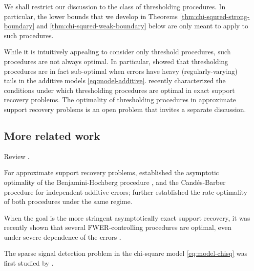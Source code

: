 We shall restrict our discussion to the class of thresholding procedures.
In particular, the lower bounds that we develop in Theorems \ref{thm:chi-squred-strong-boundary} and \ref{thm:chi-squred-weak-boundary} below are only meant to apply to such procedures.

\begin{remark}
While it is intuitively appealing to consider only threshold procedures, such procedures are not always optimal.
In particular, \citet{chen2018scan} showed that thresholding procedures are in fact sub-optimal when errors have heavy (regularly-varying) tails in the additive models \eqref{eq:model-additive}. 
\citet{gao2018fundamental} recently characterized the conditions under which thresholding procedures are optimal in exact support recovery problems.
The optimality of thresholding procedures in approximate support recovery problems is an open problem that invites a separate discussion.
\end{remark}


\subsection{More related work}

Review \cite{jin2014optimality, jin2016rare, butucea2018variable, arias2017distribution, gao2018fundamental, ji2012ups, rabinovich2017optimal}.


For approximate support recovery problems, \citet*{arias2017distribution} established the asymptotic optimality of the Benjamini-Hochberg procedure \cite{benjamini1995controlling}, and the Cand\'es-Barber procedure \cite{barber2015controlling} for independent additive errors;
\citet{rabinovich2017optimal} further established the rate-optimality of both procedures under the same regime.

When the goal is the more stringent asymptotically exact support recovery, it was recently shown that several FWER-controlling procedures are optimal, even under severe dependence of the errors \cite{gao2018fundamental}.

The sparse signal detection problem in the chi-square model \eqref{eq:model-chisq} was first studied by \cite{donoho2004higher}.


\cite{gao2019upass}


